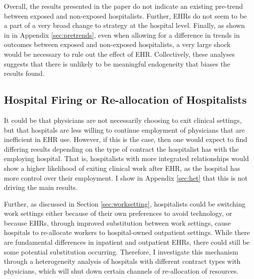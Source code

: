 \documentclass[12pt]{article}
\begin{document}
Overall, the results presented in the paper do not indicate an existing pre-trend between exposed and non-exposed hospitalists. Further, EHRs do not seem to be a part of a very broad change to strategy at the hospital level. Finally, as shown in in Appendix \ref{sec:pretrends}, even when allowing for a difference in trends in outcomes between exposed and non-exposed hospitalists, a very large shock would be necessary to rule out the effect of EHR. Collectively, these analyses suggests that there is unlikely to be meaningful endogeneity that biases the results found. 

\subsection{Hospital Firing or Re-allocation of Hospitalists}

It could be that physicians are not necessarily choosing to exit clinical settings, but that hospitals are less willing to continue employment of physicians that are inefficient in EHR use. However, if this is the case, then one would expect to find differing results depending on the type of contract the hospitalist has with the employing hospital. That is, hospitalists with more integrated relationships would show a higher likelihood of exiting clinical work after EHR, as the hospital has more control over their employment. I show in Appendix \ref{sec:het} that this is not driving the main results. 

Further, as discussed in Section \ref{sec:worksetting}, hospitalists could be switching work settings either because of their own preferences to avoid technology, or because EHRs, through improved substitution between work settings, cause hospitals to re-allocate workers to hospital-owned outpatient settings. While there are fundamental differences in inpatient and outpatient EHRs, there could still be some potential substitution occurring. Therefore, I investigate this mechanism through a heterogeneity analysis of hospitals with different contract types with physicians, which will shut down certain channels of re-allocation of resources.
\end{document}
